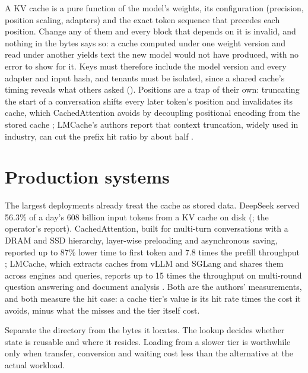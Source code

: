 A KV cache is a pure function of the model's weights, its configuration
(precision, position scaling, adapters) and the exact token sequence that
precedes each position. Change any of them and every block that depends on it
is invalid, and nothing in the bytes says so: a cache computed under one
weight version and read under another yields text the new model would not
have produced, with no error to show for it. Keys must
therefore include the model version and every adapter and input hash, and
tenants must be isolated, since a shared cache's timing reveals what others
asked (). Positions are a trap of their own: truncating
the start of a conversation shifts every later token's position and invalidates
its cache, which CachedAttention avoids by decoupling positional encoding from
the stored cache \cite{gao2024cachedattention}; LMCache's authors report that
context truncation, widely used in industry, can cut the prefix hit ratio by
about half \cite{liu2025lmcache}.

\section{Production systems}

The largest deployments already treat the cache as stored data. DeepSeek served
56.3\% of a day's 608 billion input tokens from a KV cache on disk
(\cite{deepseek2025inference}; the operator's report). CachedAttention, built
for multi-turn conversations with a DRAM and SSD hierarchy, layer-wise
preloading and asynchronous saving, reported up to 87\% lower time to first
token and 7.8 times the prefill throughput \cite{gao2024cachedattention}; LMCache,
which extracts caches from vLLM and SGLang and shares them across engines and
queries, reports up to 15 times the throughput on multi-round question
answering and document analysis \cite{liu2025lmcache}. Both are the authors'
measurements, and both measure the hit case: a cache tier's value is its hit
rate times the cost it avoids, minus what the misses and the tier itself cost.

Separate the directory from the bytes it locates. The lookup decides whether state is reusable and where it resides. Loading from a slower tier is worthwhile only when transfer, conversion and waiting cost less than the alternative at the actual workload.


